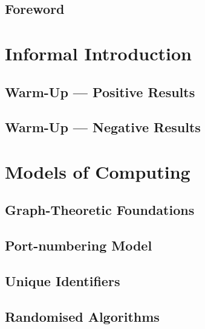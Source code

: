 





\frontmatter
\maketitle
\tableofcontents

\chapter*{Foreword}


\mainmatter
\part{Informal Introduction}

\chapter{Warm-Up --- Positive Results}


\chapter{Warm-Up --- Negative Results}


\part{Models of Computing}

\chapter{Graph-Theoretic Foundations}


\chapter{Port-numbering Model}


\chapter{Unique Identifiers}


\chapter{Randomised Algorithms}



